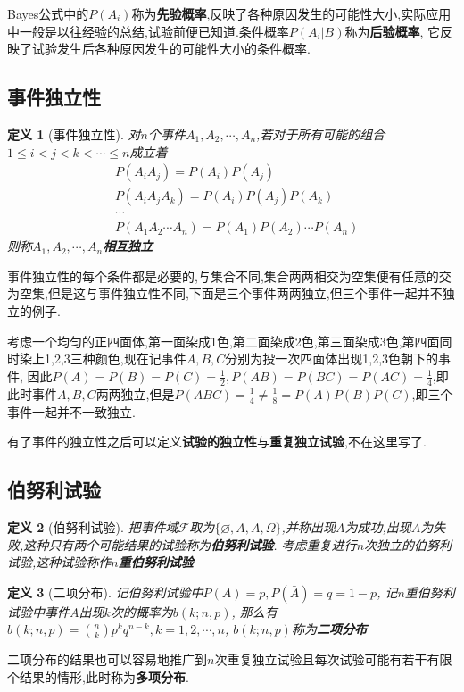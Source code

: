 \documentclass[12pt,a4paper]{article}
\newtheorem{definition}{定义}[subsection] %
\begin{document}
Bayes公式中的$P(A_i)$称为\textbf{先验概率},反映了各种原因发生的可能性大小,实际应用中一般是以往经验的总结,试验前便已知道.条件概率$P(A_i|B)$称为\textbf{后验概率},
它反映了试验发生后各种原因发生的可能性大小的条件概率.
\subsection{事件独立性}
\begin{definition}[事件独立性]
    对$n$个事件$A_1,A_2,\cdots,A_n$,若对于所有可能的组合$1\leq i<j<k<\cdots\leq n$成立着
    \[\begin{aligned}
        & P(A_i A_j) = P(A_i)P(A_j)\\
        & P(A_i A_j A_k) = P(A_i)P(A_j)P(A_k)\\
        & \cdots\\
        &P(A_1 A_2 \cdots A_n) = P(A_1)P(A_2)\cdots P(A_n)
    \end{aligned}\]
    则称$A_1,A_2,\cdots,A_n$\textbf{相互独立}
\end{definition}
事件独立性的每个条件都是必要的,与集合不同,集合两两相交为空集便有任意的交为空集,但是这与事件独立性不同,下面是三个事件两两独立,但三个事件一起并不独立的例子.

考虑一个均匀的正四面体,第一面染成1色,第二面染成2色,第三面染成3色,第四面同时染上1,2,3三种颜色,现在记事件$A,B,C$分别为投一次四面体出现1,2,3色朝下的事件,
因此$P(A)=P(B)=P(C)=\frac{1}{2},P(AB)=P(BC)=P(AC)=\frac{1}{4}$,即此时事件$A,B,C$两两独立,但是$P(ABC)=\frac{1}{4}\neq\frac{1}{8}=P(A)P(B)P(C)$,即三个事件一起并不一致独立.

有了事件的独立性之后可以定义\textbf{试验的独立性}与\textbf{重复独立试验},不在这里写了.
\subsection{伯努利试验}
\begin{definition}[伯努利试验]
    把事件域$\mathscr{F}$取为$\{\varnothing,A,\bar{A},\varOmega\}$,并称出现$A$为成功,出现$\bar{A}$为失败,这种只有两个可能结果的试验称为\textbf{伯努利试验}.
    考虑重复进行$n$次独立的伯努利试验,这种试验称作\textbf{$n$重伯努利试验}
\end{definition}
\begin{definition}[二项分布]
    记伯努利试验中$P(A)=p,P(\bar{A})=q=1-p$, 记$n$重伯努利试验中事件$A$出现$k$次的概率为$b(k;n,p)$, 那么有$b(k;n,p)= {n\choose k}p^kq^{n-k},k=1,2,\cdots,n$, $b(k;n,p)$称为\textbf{二项分布}
\end{definition}
二项分布的结果也可以容易地推广到$n$次重复独立试验且每次试验可能有若干有限个结果的情形,此时称为\textbf{多项分布}.
\end{document}
